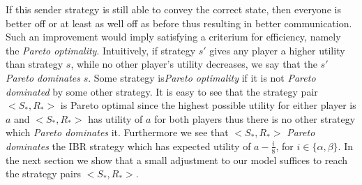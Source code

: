 \documentclass[10pt]{article}
\begin{document}
If this sender strategy is still able to convey the correct state, then everyone is better off or at least as well off as before thus resulting in better communication. Such an improvement would imply satisfying a criterium for efficiency, namely the \textit{Pareto optimality}.
Intuitively, if strategy $s'$ gives any player a higher utility than strategy $s$, while no other player's utility decreases, we say that the $s'$ \textit{Pareto dominates} $s$. Some strategy is\textit{Pareto optimality} if it is not \textit{Pareto dominated} by some other strategy.
It is easy to see that the strategy pair $<S_*,R_*>$ is Pareto optimal since the highest possible utility for either player is $a$ and $<S_*,R_*>$ has utility of $a$ for both players thus there is no other strategy which \textit{Pareto dominates} it. Furthermore we see that $<S_*,R_*>$ \textit{Pareto dominates} the IBR strategy which has expected utility of $a-\tfrac{i}{8}$, for $i\in \{\alpha,\beta \}$. In the next section we show that a small adjustment to our model suffices to reach the strategy pairs $<S_*,R_*>$.
\end{document}
